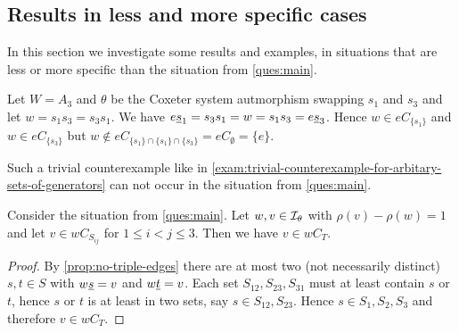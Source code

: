 \subsection{Results in less and more specific cases}
\label{sec:sec:main-thesis-less-more-specific}

%
%		

In this section we investigate some results and examples, in situations that are less or more specific than the situation from \ref{ques:main}.

\begin{exam}
	Let $W = A_3$ and $\theta$ be the Coxeter system autmorphism swapping $s_1$ and $s_3$ and let $w = s_1s_3 = s_3s_1$. We have $e \underline{s}_1 = s_3 s_1 = w = s_1 s_3 = e \underline{s}_3$. Hence $w \in eC_{\{s_1\}}$ and $w \in eC_{\{s_3\}}$ but $w \notin eC_{\{s_1\} \cap \{s_1\} \cap \{s_3\}} = eC_\emptyset = \{e\}$.
\end{exam}

Such a trivial counterexample like in \ref{exam:trivial-counterexample-for-arbitary-sets-of-generators} can not occur in the situation from \ref{ques:main}.

\begin{prop}
	Consider the situation from \ref{ques:main}. Let $w,v \in \mathcal{I}_{\theta}$ with $\rho(v) - \rho(w) = 1$ and let $v \in w C_{S_{ij}}$ for $1 \leq i < j \leq 3$. Then we have $v \in wC_T$.

	\begin{proof}
		By \ref{prop:no-triple-edges} there are at most two (not necessarily distinct) $s,t \in S$ with $w \underline{s} = v$ and $w \underline{t} = v$. Each set $S_{12},S_{23},S_{31}$ must at least contain $s$ or $t$, hence $s$ or $t$ is at least in two sets, say $s \in S_{12},S_{23}$. Hence $s \in S_1,S_2,S_3$ and therefore $v \in wC_T$.
	\end{proof}
\end{prop}

